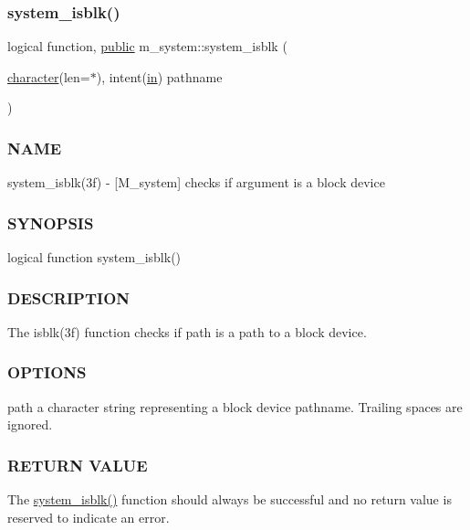 \subsubsection{\texorpdfstring{system\+\_\+isblk()}{system\_isblk()}}
{\footnotesize\ttfamily logical function, \hyperlink{M__stopwatch_83_8txt_a2f74811300c361e53b430611a7d1769f}{public} m\+\_\+system\+::system\+\_\+isblk (\begin{DoxyParamCaption}\item[{\hyperlink{option__stopwatch_83_8txt_abd4b21fbbd175834027b5224bfe97e66}{character}(len=$\ast$), intent(\hyperlink{M__journal_83_8txt_afce72651d1eed785a2132bee863b2f38}{in})}]{pathname }\end{DoxyParamCaption})}



\subsubsection*{N\+A\+ME}

system\+\_\+isblk(3f) -\/ \mbox{[}M\+\_\+system\mbox{]} checks if argument is a block device 

\subsubsection*{S\+Y\+N\+O\+P\+S\+IS}

\begin{DoxyVerb}logical function system_isblk()
\end{DoxyVerb}


\subsubsection*{D\+E\+S\+C\+R\+I\+P\+T\+I\+ON}

The isblk(3f) function checks if path is a path to a block device.

\subsubsection*{O\+P\+T\+I\+O\+NS}

path a character string representing a block device pathname. Trailing spaces are ignored.

\subsubsection*{R\+E\+T\+U\+RN V\+A\+L\+UE}

The \hyperlink{namespacem__system_a791fa587005ec07cbcd7b0045ee6f43f}{system\+\_\+isblk()} function should always be successful and no return value is reserved to indicate an error.

